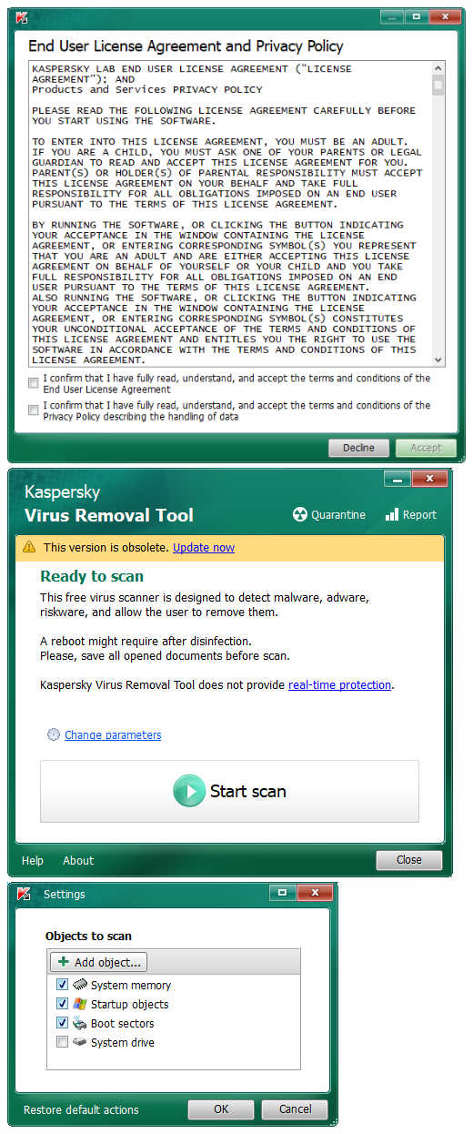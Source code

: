 \begin{center}
	\includegraphics[scale=0.5]{pic/kvrt_eula.PNG}        \includegraphics[scale=0.6]{pic/kvrt_ready.PNG}\\
	\includegraphics[scale=0.6]{pic/kvrt_conf.PNG}

\end{center}
